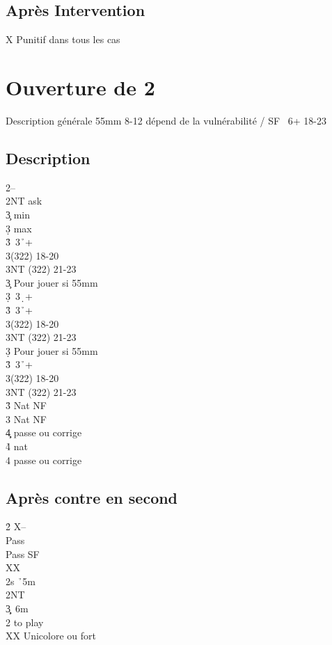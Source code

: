 \documentclass[a4paper]{article}
\begin{document}
\subsection{Après Intervention}

X Punitif dans tous les cas

\newpage

\section{Ouverture de 2\pdfs}

Description générale 55mm 8-12 dépend de la vulnérabilité / SF \s\ 6+ 18-23

\subsection{Description}

\begin{bidtable}
2\s--\+\\
2NT \> ask\+\\
3\c \> 55mm min\\
3\d \> 55mm max\\
3\h {}\s\ 3\h\ +\\
3\s {}(322) 18-20\\
3NT (322) 21-23\-\\
3\c \> Pour jouer si 55mm\+\\
3\d {}\s\ 3\d\ +\\
3\h {}\s\ 3\h\ +\\
3\s {}(322) 18-20\\
3NT (322) 21-23\-\\
3\d \> Pour jouer si 55mm\+\\
3\h {}\s\ 3\h\ +\\
3\s {}(322) 18-20\\
3NT (322) 21-23\-\\
3\h \> Nat NF\\
3\s \> Nat NF\\
4\c\d \> passe ou corrige\\
4\h \> nat\\
4\s \> passe ou corrige\-
\end{bidtable}

\subsection{Après contre en second}

\begin{bidtable}
2\h \> X--\+\\
Pass\+\\
Pass \> SF \h \\
XX \s \\
2s \h\ 5m\\
2NT\\
3\c\d {}\s\ 6m\-\\
2\s \> to play\\
XX \> Unicolore ou fort\-
\end{bidtable}
\end{document}
